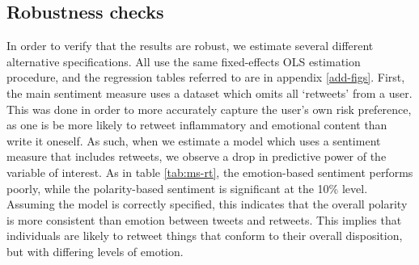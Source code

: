 \documentclass{article}
\begin{document}
\subsection{Robustness checks}\label{robust}
In order to verify that the results are robust, we estimate several different alternative specifications. All use the same fixed-effects OLS estimation procedure, and the regression tables referred to are in appendix \ref{add-figs}. First, the main sentiment measure uses a dataset which omits all `retweets' from a user. This was done in order to more accurately capture the user's own risk preference, as one is be more likely to retweet inflammatory and emotional content than write it oneself. As such, when we estimate a model which uses a sentiment measure that includes retweets, we observe a drop in predictive power of the variable of interest. As in table \ref{tab:ms-rt}, the emotion-based sentiment performs poorly, while the polarity-based sentiment is significant at the 10\% level. Assuming the model is correctly specified, this indicates that the overall polarity is more consistent than emotion between tweets and retweets. This implies that individuals are likely to retweet things that conform to their overall disposition, but with differing levels of emotion. 
\end{document}

